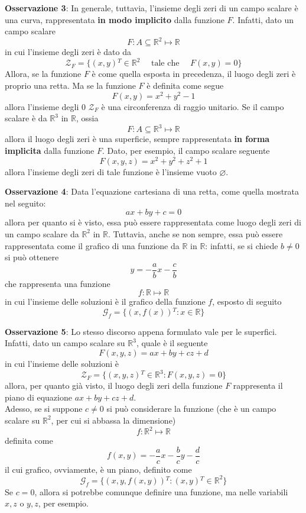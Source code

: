 \documentclass[a4paper]{extarticle}
\begin{document}
\vspace{2em}
\noindent
\textbf{Osservazione 3}: In generale, tuttavia, l'insieme degli zeri di un campo scalare è una curva, rappresentata \textbf{in modo implicito} dalla funzione $F$. Infatti, dato un campo scalare
\[F : A \subseteq \mathbb{R}^2 \longmapsto \mathbb{R}\]
in cui l'insieme degli zeri è dato da 
\[\mathcal{Z}_F = \{(x,y){^T} \in \mathbb{R}^2 \hspace{1em} \text{ tale che } \hspace{1em} F(x,y) = 0\}\]
Allora, se la funzione $F$ è come quella esposta in precedenza, il luogo degli zeri è proprio una retta. Ma se la funzione $F$ è definita come segue
\[F(x,y) = x^2+y^2-1\]
allora l'insieme degli $0$ $\mathcal{Z}_F$ è una circonferenza di raggio unitario. Se il campo scalare è da $\mathbb{R}^3$ in $\mathbb{R}$, ossia 
\[F : A \subseteq \mathbb{R}^3 \longmapsto \mathbb{R}\]
allora il luogo degli zeri è una superficie, sempre rappresentata \textbf{in forma implicita} dalla funzione $F$. Dato, per esempio, il campo scalare seguente
\[F(x,y,z) = x^2+y^2+z^2+1\]
allora l'insieme degli zeri di tale funzione è l'insieme vuoto $\varnothing$.

\vspace{2em}
\noindent
\textbf{Osservazione 4}: Data l'equazione cartesiana di una retta, come quella mostrata nel seguito:
\[ax + by + c = 0\]
allora per quanto si è visto, essa può essere rappresentata come luogo degli zeri di un campo scalare da $\mathbb{R}^2$ in $\mathbb{R}$. Tuttavia, anche se non sempre, essa può essere rappresentata come il grafico di una funzione da $\mathbb{R}$ in $\mathbb{R}$: infatti, se si chiede $b \neq 0$ si può ottenere
\[y=-\frac{a}{b} x - \frac{c}{b}\]
che rappresenta una funzione
\[f : \mathbb{R} \longmapsto \mathbb{R}\]
in cui l'insieme delle soluzioni è il grafico della funzione $f$, esposto di seguito
\[\mathcal{G}_f = \{(x,f(x)){^T} : x \in \mathbb{R}\}\]

\vspace{2em}
\noindent
\textbf{Osservazione 5}: Lo stesso discorso appena formulato vale per le superfici. Infatti, dato un campo scalare su $\mathbb{R}^3$, quale è il seguente
\[F(x,y,z) = ax+by+cz+d\]
in cui l'insieme delle soluzioni è
\[\mathcal{Z}_F = \{(x,y,z){^T} \in \mathbb{R}^3 : F(x,y,z) = 0\}\]
allora, per quanto già visto, il luogo degli zeri della funzione $F$ rappresenta il piano di equazione $ax+by+cz+d$.\\
Adesso, se si suppone $c \neq 0$ si può considerare la funzione (che è un campo scalare su $\mathbb{R}^2$, per cui si abbassa la dimensione)
\[f : \mathbb{R}^2 \longmapsto \mathbb{R}\]
definita come
\[f(x,y)=-\frac{a}{c} x - \frac{b}{c} y - \frac{d}{c}\]
il cui grafico, ovviamente, è un piano, definito come 
\[\mathcal{G}_f = \{(x,y,f(x,y)){^T} : (x,y){^T} \in \mathbb{R}^2\}\]
Se $c=0$, allora si potrebbe comunque definire una funzione, ma nelle variabili $x,z$ o $y,z$, per esempio.
\end{document}
